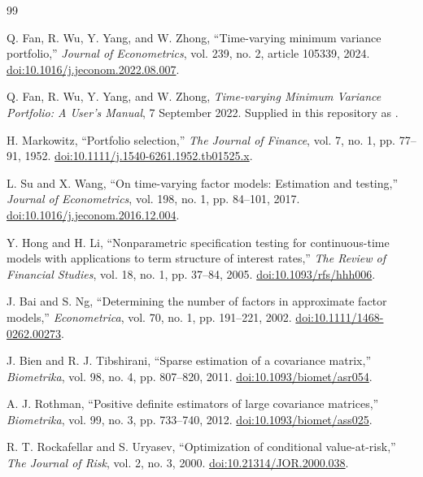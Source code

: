 \documentclass[11pt,a4paper]{article}
\begin{document}
\clearpage
\begin{thebibliography}{99}

Q. Fan, R. Wu, Y. Yang, and W. Zhong,
``Time-varying minimum variance portfolio,''
\emph{Journal of Econometrics}, vol. 239, no. 2, article 105339, 2024.
\href{https://doi.org/10.1016/j.jeconom.2022.08.007}{doi:10.1016/j.jeconom.2022.08.007}.

Q. Fan, R. Wu, Y. Yang, and W. Zhong,
\emph{Time-varying Minimum Variance Portfolio: A User's Manual}, 7 September 2022.
Supplied in this repository as .

H. Markowitz,
``Portfolio selection,''
\emph{The Journal of Finance}, vol. 7, no. 1, pp. 77--91, 1952.
\href{https://doi.org/10.1111/j.1540-6261.1952.tb01525.x}{doi:10.1111/j.1540-6261.1952.tb01525.x}.

L. Su and X. Wang,
``On time-varying factor models: Estimation and testing,''
\emph{Journal of Econometrics}, vol. 198, no. 1, pp. 84--101, 2017.
\href{https://doi.org/10.1016/j.jeconom.2016.12.004}{doi:10.1016/j.jeconom.2016.12.004}.

Y. Hong and H. Li,
``Nonparametric specification testing for continuous-time models with applications to term structure of interest rates,''
\emph{The Review of Financial Studies}, vol. 18, no. 1, pp. 37--84, 2005.
\href{https://doi.org/10.1093/rfs/hhh006}{doi:10.1093/rfs/hhh006}.

J. Bai and S. Ng,
``Determining the number of factors in approximate factor models,''
\emph{Econometrica}, vol. 70, no. 1, pp. 191--221, 2002.
\href{https://doi.org/10.1111/1468-0262.00273}{doi:10.1111/1468-0262.00273}.

J. Bien and R. J. Tibshirani,
``Sparse estimation of a covariance matrix,''
\emph{Biometrika}, vol. 98, no. 4, pp. 807--820, 2011.
\href{https://doi.org/10.1093/biomet/asr054}{doi:10.1093/biomet/asr054}.

A. J. Rothman,
``Positive definite estimators of large covariance matrices,''
\emph{Biometrika}, vol. 99, no. 3, pp. 733--740, 2012.
\href{https://doi.org/10.1093/biomet/ass025}{doi:10.1093/biomet/ass025}.

R. T. Rockafellar and S. Uryasev,
``Optimization of conditional value-at-risk,''
\emph{The Journal of Risk}, vol. 2, no. 3, 2000.
\href{https://doi.org/10.21314/JOR.2000.038}{doi:10.21314/JOR.2000.038}.


\end{thebibliography}
\end{document}
